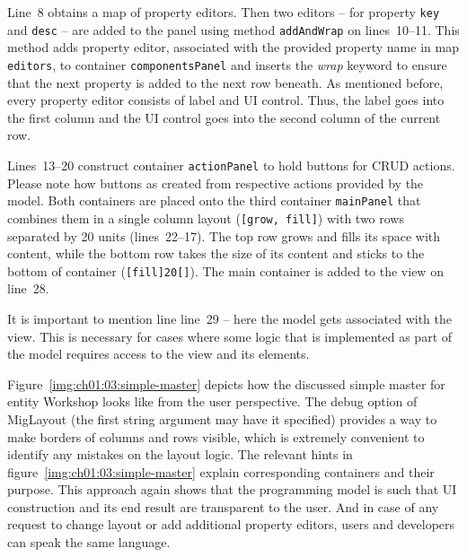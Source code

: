   Line~8 obtains a map of property editors.
  Then two editors -- for property \texttt{key} and \texttt{desc} -- are added to the panel using method \texttt{addAndWrap} on lines~10--11.
  This method adds property editor, associated with the provided property name in map \texttt{editors}, to container \texttt{componentsPanel} and inserts the \emph{wrap} keyword to ensure that the next property is added to the next row beneath.
  As mentioned before, every property editor consists of label and UI control.
  Thus, the label goes into the first column and the UI control goes into the second column of the current row.
  
  Lines~13--20 construct container \texttt{actionPanel} to hold buttons for CRUD actions.
  Please note how buttons as created from respective actions provided by the model.
  Both containers are placed onto the third container \texttt{mainPanel} that combines them in a single column layout (\texttt{[grow, fill]}) with two rows separated by 20 units (lines~22--17).
  The top row grows and fills its space with content, while the bottom row takes the size of its content and sticks to the bottom of container (\texttt{[fill]20[]}).
  The main container is added to the view on line~28.
  
  It is important to mention line line~29 -- here the model gets associated with the view.
  This is necessary for cases where some logic that is implemented as part of the model requires access to the view and its elements.
  
  
  Figure~\ref{img:ch01:03:simple-master} depicts how the discussed simple master for entity Workshop looks like from the user perspective.  
  The debug option of MigLayout (the first string argument may have it specified) provides a way to make borders of columns and rows visible, which is extremely convenient to identify any mistakes on the layout logic.
  The relevant hints in figure~\ref{img:ch01:03:simple-master} explain corresponding containers and their purpose.
  This approach again shows that the programming model is such that UI construction and its end result are transparent to the user.
  And in case of any request to change layout or add additional property editors, users and developers can speak the same language.
  
